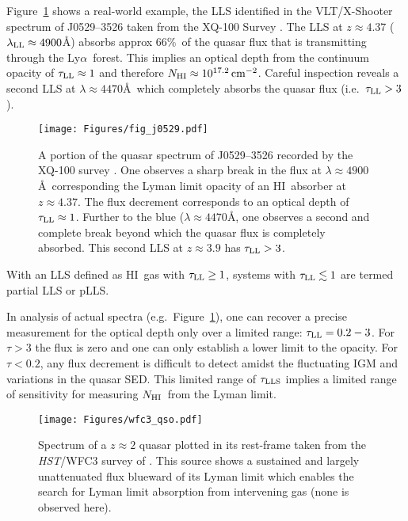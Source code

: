 \documentclass[graybox]{svmult}
\newcommand{\HI}{H{\sc I}}
\def\lya{Ly$\alpha$}
\newcommand{\mnhi}{N_{\rm HI}}
\newcommand{\nhi}{$\mnhi$}
\def\cm#1{\, {\rm cm^{#1}}}
\begin{document}
Figure~\ref{fig:j0529} shows a real-world example, the
LLS identified in the VLT/X-Shooter spectrum of 
J0529--3526 taken from the XQ-100 Survey \cite{xq_100}.
The LLS at $z \approx 4.37$ ($\lambda_{\rm LL} \approx 4900$\AA)
absorbs approx 66\%\ of the quasar flux that is transmitting
through the \lya\ forest.  This implies an optical depth
from the continuum opacity of $\tau_{\rm LL} \approx 1$
and therefore $\mnhi \approx 10^{17.2} \cm{-2}$.
Careful inspection reveals a second LLS at $\lambda \approx 4470$\AA\
which completely absorbs the quasar flux (i.e.\ $\tau_{\rm LL} > 3$).

%
\begin{figure}[b]
\sidecaption
\texttt{[image: Figures/fig\_j0529.pdf]}
%
%
\caption{A portion of the quasar spectrum of J0529--3526 recorded
by the XQ-100 survey \cite{xq_100}.  One observes a sharp break
in the flux at $\lambda \approx 4900$\AA\ corresponding the 
Lyman limit opacity of an \HI\ absorber at $z \approx 4.37$.
The flux decrement corresponds to an optical depth of 
$\tau_{\rm LL} \approx 1$.  Further to the blue 
($\lambda \approx 4470$\AA, one observes
a second and complete break beyond which the quasar flux
is completely absorbed.  This second LLS at $z \approx 3.9$
has $\tau_{\rm LL} > 3$.
}
\label{fig:j0529}       %
\end{figure}

With an LLS defined as \HI\ gas with $\tau_{\rm LL} \ge 1$,
systems with $\tau_{\rm LL} \lesssim 1$ are termed partial
LLS or pLLS.  

In analysis of actual spectra (e.g.\ Figure~\ref{fig:j0529}),
one can recover a precise measurement for the optical depth
only over a limited range: $\tau_{\rm LL} = 0.2 - 3$.  
For $\tau > 3$ the flux is zero and one can only establish
a lower limit to the opacity.
For $\tau < 0.2$, any flux decrement is difficult 
to detect amidst the fluctuating IGM and variations in the quasar SED.
This limited range of $\tau_{\rm LLS}$ implies a limited
range of sensitivity for measuring \nhi\ from the Lyman limit.

%
\begin{figure}[b]
\sidecaption
\texttt{[image: Figures/wfc3\_qso.pdf]}
%
%
\caption{Spectrum of a $z \approx 2$ quasar plotted in its
rest-frame taken from the {\it HST}/WFC3 survey of \cite{omeara13}.
This source shows a sustained and largely unattenuated 
flux blueward of its Lyman limit which enables the search for
Lyman limit absorption from intervening gas (none is observed here).
}
\label{fig:wfc3}       %
\end{figure}
\end{document}
